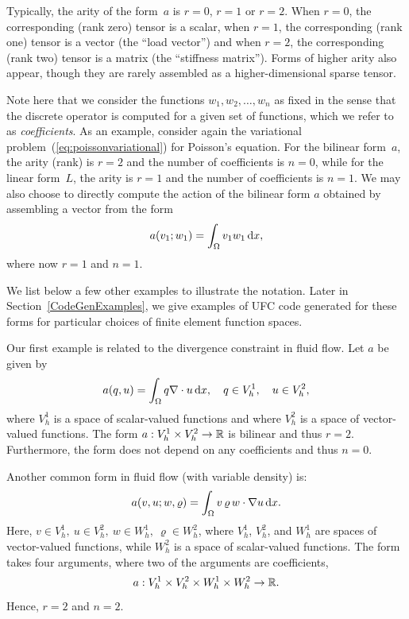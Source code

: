 Typically, the arity of the form~$a$ is $r = 0$, $r = 1$
or $r = 2$. When $r = 0$, the corresponding (rank zero) tensor is a
scalar, when $r = 1$, the corresponding (rank one) tensor is a vector
(the ``load vector'') and when $r = 2$, the corresponding (rank two)
tensor is a matrix (the ``stiffness matrix'').
Forms of higher arity also appear, though they are rarely assembled as
a higher-dimensional sparse tensor.

Note here that we consider the functions $w_1, w_2, \ldots, w_n$ as
fixed in the sense that the discrete operator is computed for a given
set of functions, which we refer to as \emph{coefficients}. As an
example, consider again the variational
problem~(\ref{eq:poissonvariational}) for Poisson's equation. For the
bilinear form~$a$, the arity (rank) is $r = 2$ and the number of
coefficients is $n = 0$, while for the linear form~$L$, the arity is
$r = 1$ and the number of coefficients is $n = 1$. We may also choose
to directly compute the action of the bilinear form $a$ obtained by
assembling a vector from the form
\begin{equation}
  a(v_1; w_1) = \int_{\Omega} v_1 w_1 \, \mathrm{d}x,
\end{equation}
where now $r = 1$ and $n = 1$.

We list below a few other examples to illustrate the notation. Later
in Section~\ref{CodeGenExamples}, we give examples of UFC code
generated for these forms for particular choices of finite element
function spaces.

\begin{example}
\label{example:div}
Our first example is related
to the divergence constraint in fluid flow. Let $a$ be given by
\begin{equation}
a(q, u) = \int_{\Omega} q \nabla \cdot u \, \mathrm{d}x, \quad q\in V_h^1, \quad u\in V_h^2, 
\end{equation}
where $V_h^1$ is a space of scalar-valued functions and
where $V_h^2$ is a space of vector-valued functions.
The form $a : V_h^1 \times V_h^2  \rightarrow \mathbb{R}$ is bilinear and
thus $r = 2$. Furthermore, the form does not depend on any
coefficients and thus $n=0$.   
\end{example}

\begin{example}
\label{example:nonlinearconv}
Another common form in fluid flow (with variable density) is: 
\begin{equation}
a(v,u;w,\varrho) = \int_{\Omega} v \, \varrho \, w \cdot \nabla  u \, \mathrm{d}x. 
\end{equation}
Here, $v\in V_h^1,\ u \in V_h^2,\ w\in W_h^1, \ \varrho \in W_h^2$, where
$V_h^1$, $V_h^2$, and $W_h^1$ are spaces of vector-valued functions, while $W_h^2$ is a space of  
scalar-valued functions. 
The form takes four arguments, where two of the arguments
are coefficients,
\begin{equation}
a : V_h^1 \times V_h^2 \times W_h^1 \times W_h^2 \rightarrow \mathbb{R}.
\end{equation}
Hence, $r=2$ and $n=2$. 
\end{example}

